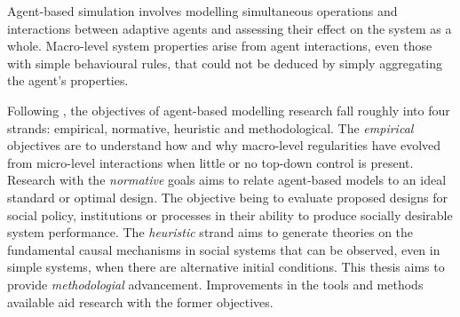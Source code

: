 Agent-based simulation involves modelling simultaneous operations and
interactions between adaptive agents and assessing their effect on the system
as a whole.  Macro-level system properties arise from agent interactions, even
those with simple behavioural rules, that could not be deduced by simply
aggregating the agent's properties. %

Following , the objectives of agent-based modelling
research fall roughly into four strands: empirical, normative, heuristic and
methodological. The \textit{empirical} objectives are to understand how and why macro-level
regularities have evolved from micro-level interactions when little or no
top-down control is present.  Research with the \textit{normative} goals aims
to relate agent-based models to an ideal standard or optimal design.  The objective being
to evaluate proposed designs for social policy, institutions or processes in
their ability to produce socially desirable system performance.  The
\textit{heuristic} strand aims to generate theories on the fundamental causal
mechanisms in social systems that can be observed, even in simple systems, when there are
alternative initial conditions.  This thesis aims to provide
\textit{methodologial} advancement.  Improvements in the tools and methods
available aid research with the former objectives.

